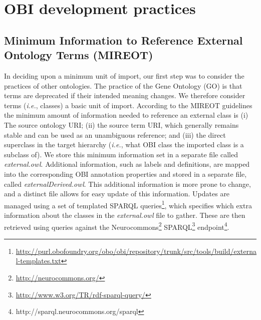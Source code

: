 \documentclass{elsart}       %
\begin{document}
\section{OBI development practices}


\subsection{Minimum Information to Reference External Ontology Terms (MIREOT)}

In deciding upon a minimum unit of import, our first step was to consider the practices of other ontologies.
The practice of the Gene Ontology (GO)\cite{go} is that terms are deprecated if their intended meaning changes\cite{deprecated}.
We therefore consider terms (\emph{i.e.}, classes) a basic unit of import.
According to the MIREOT guidelines the minimum amount of information needed to reference an external class is (i) The source ontology URI; (ii) the source term URI, which generally remains stable and can be used as an unambiguous reference; and (iii) the direct superclass in the target hierarchy (\emph{i.e.}, what OBI class the imported class is a subclass of).
We store this minimum information set in a separate file called \emph{external.owl}. 
Additional information, such as labels and definitions, are mapped into the corresponding OBI annotation properties and stored in a separate file, called \emph{externalDerived.owl}. This additional information is more prone to change, and a distinct file allows for easy update of this information.
Updates are managed using a set of templated SPARQL queries\footnote{\url{http://purl.obofoundry.org/obo/obi/repository/trunk/src/tools/build/external-templates.txt}}, which specifies which extra information about the classes in the \emph{external.owl} file to gather.
These are then retrieved using queries against the Neurocommons\footnote{\url{http://neurocommons.org/}} SPARQL\footnote{\url{http://www.w3.org/TR/rdf-sparql-query/}} endpoint\footnote{http://sparql.neurocommons.org/sparql}.

\end{document}
